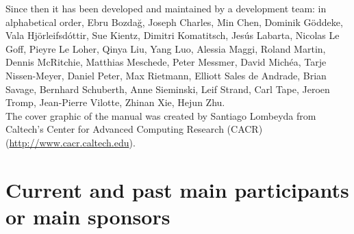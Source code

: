 \documentclass[oneside,english]{book}
\newcommand{\urlwithparentheses}[1]{(\url{#1})}
\begin{document}
Since then it has been developed and maintained by a development team: in alphabetical order,
Ebru Bozda\u{g},
Joseph Charles,
Min Chen,
Dominik G\"oddeke,
Vala Hj\"orleifsd\'ottir,
Sue Kientz,
Dimitri Komatitsch,
Jes\'us Labarta,
Nicolas Le Goff,
Pieyre Le Loher,
Qinya Liu,
Yang Luo,
Alessia Maggi,
Roland Martin,
Dennis McRitchie,
Matthias Meschede,
Peter Messmer,
David Mich\'ea,
Tarje Nissen-Meyer,
Daniel Peter,
Max Rietmann,
Elliott Sales de Andrade,
Brian Savage,
Bernhard Schuberth,
Anne Sieminski,
Leif Strand,
Carl Tape,
Jeroen Tromp,
Jean-Pierre Vilotte,
Zhinan Xie,
Hejun Zhu.\\

The cover graphic of the manual was created
by Santiago Lombeyda from Caltech's Center for Advanced Computing Research (CACR) \urlwithparentheses{http://www.cacr.caltech.edu}.\\

\section*{Current and past main participants or main sponsors}
\end{document}
